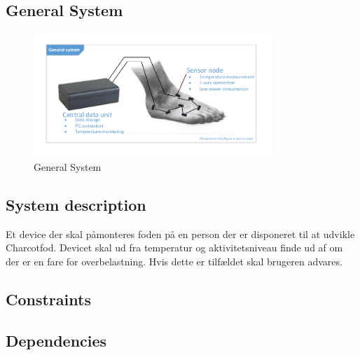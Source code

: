 \subsection{General System}
\begin{figure}[H]
	\centering
	\includegraphics[width=0.8\textwidth]{billeder/GeneralSystem}
	\caption{General System}
\end{figure}

\subsection{System description}
Et device der skal påmonteres foden på en person der er disponeret til at udvikle Charcotfod. Devicet skal ud fra temperatur og aktivitetsniveau finde ud af om der er en fare for overbelastning. Hvis dette er tilfældet skal brugeren advares.

\subsection{Constraints}

\subsection{Dependencies}



